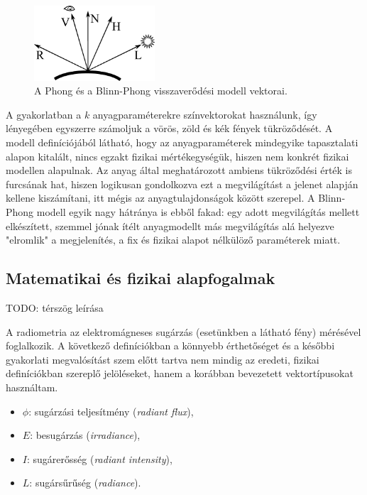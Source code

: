 \begin{figure}[!ht]
    \centering
    \includegraphics[width=0.4\textwidth]{images/blinn_vectors.eps}
    \caption{A Phong és a Blinn-Phong visszaverődési modell vektorai.}
\end{figure}

A gyakorlatban a \(k\) anyagparaméterekre színvektorokat használunk, így lényegében egyszerre számoljuk a vörös, zöld és kék fények tükröződését. A modell definíciójából látható, hogy az anyagparaméterek mindegyike tapasztalati alapon kitalált, nincs egzakt fizikai mértékegységük, hiszen nem konkrét fizikai modellen alapulnak. Az anyag által meghatározott ambiens tükröződési érték is furcsának hat, hiszen logikusan gondolkozva ezt a megvilágítást a jelenet alapján kellene kiszámítani, itt mégis az anyagtulajdonságok között szerepel. A Blinn-Phong modell egyik nagy hátránya is ebből fakad: egy adott megvilágítás mellett elkészített, szemmel jónak ítélt anyagmodellt más megvilágítás alá helyezve "elromlik" a megjelenítés, a fix és fizikai alapot nélkülöző paraméterek miatt.

\subsection{Matematikai és fizikai alapfogalmak}
\label{subsec:matbase}

TODO: térszög leírása

A radiometria az elektromágneses sugárzás (esetünkben a látható fény) mérésével foglalkozik. A következő definíciókban a könnyebb érthetőséget és a későbbi gyakorlati megvalósítást szem előtt tartva nem mindig az eredeti, fizikai definíciókban szereplő jelöléseket, hanem a korábban bevezetett vektortípusokat használtam.

\begin{itemize}[noitemsep]
\item \(\phi\): sugárzási teljesítmény (\textit{radiant flux}),
\item \(E\): besugárzás (\textit{irradiance}),
\item \(I\): sugárerősség (\textit{radiant intensity}),
\item \(L\): sugársűrűség (\textit{radiance}).
\end{itemize}

